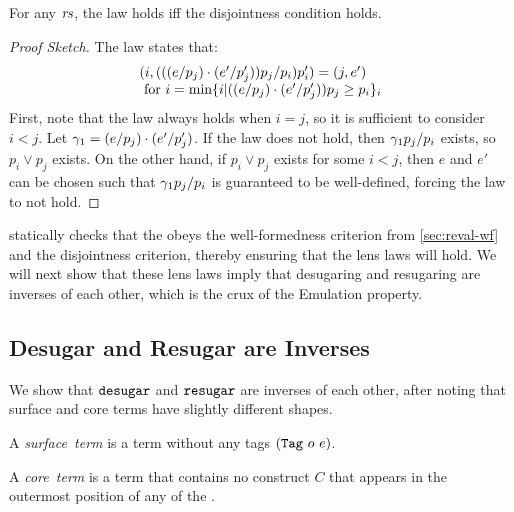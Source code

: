 \begin{theorem}
\label{thm:reval-putget}
For any {} $\mathit{rs}$, the {\Putget} law holds iff the disjointness
condition holds.
\end{theorem}
\begin{proof}[Proof Sketch]
The law states that:
\[\begin{array}{lcll}
(i, (((e / p_j) \cdot (e' / p_j'))p_j / p_i)p_i')
  = (j, e') \\
   \text{ for $i = \text{min} \{i |
               ((e / p_j) \cdot (e' / p_j'))p_j \geq p_i\}_i$}
\end{array}\]
First, note that the law always holds when $i = j$, so it is sufficient to
consider $i < j$. Let $\gamma_1 = (e / p_j) \cdot (e' /
p_j')$. If the {\Putget} law does not hold, then $\gamma_1 p_j /
p_i$ exists, so $p_i \!\vee\! p_j$ exists. On the other hand, if $p_i \!\vee\!
p_j$ exists for some $i < j$, then $e$ and $e'$ can be chosen such that
$\gamma_1 p_j / p_i$ is guaranteed to be well-defined, forcing the
law to not hold.
\end{proof}


{\Resugarer} statically checks that the {} obeys the
well-formedness criterion from \cref{sec:reval-wf}
and the disjointness criterion, thereby ensuring
that the lens laws will hold. We will next show that these lens laws imply
that desugaring and resugaring are inverses of each
other, which is the crux of the Emulation property.


\subsection{Desugar and Resugar are Inverses}
\label{sec:reval-inverses}

We show that $\texttt{desugar}$ and $\texttt{resugar}$ are inverses of each
other, after noting that surface and core terms have slightly
different shapes.

\begin{definition}
A \emph{surface~term} is a term without any tags $(\texttt{Tag}\ o\ e)$.
\end{definition}
\begin{definition}
A \emph{core~term} is a term that contains no construct $C$ that appears
in the outermost position of any  of the {}.
\end{definition}

